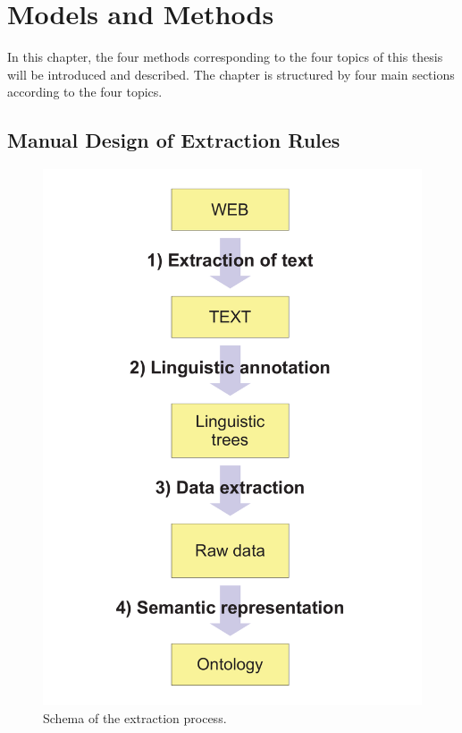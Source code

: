 \chapter{Models and Methods} \label{sec:ch_methods} 


In this chapter, the four methods corresponding to the four topics of this thesis will be introduced and described. The chapter is structured by four main sections according to the four topics. 



\section{Manual Design of Extraction Rules} \label{sec:manual_methods}
\graphicspath{{../img/ch50/}}

\begin{figure}
\vspace{-0.5cm}
\centerline{\includegraphics[width=\hsize]{ap_schema}}
\caption{Schema of the extraction process.}
\label{fig:manual_ap_schema}
\end{figure}


